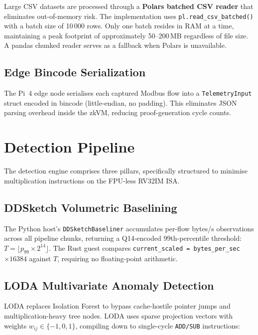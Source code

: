 \documentclass[12pt,a4paper]{article}
\begin{document}
Large CSV datasets are processed through a \textbf{Polars batched CSV reader}
that eliminates out-of-memory risk. The implementation uses
\texttt{pl.read\_csv\_batched()} with a batch size of 10\,000 rows.
Only one batch resides in RAM at a time, maintaining a peak footprint of
approximately 50--200\,MB regardless of file size. A pandas chunked reader
serves as a fallback when Polars is unavailable.

\subsection{Edge Bincode Serialization}

The Pi~4 edge node serialises each captured Modbus flow into a
\texttt{TelemetryInput} struct encoded in bincode (little-endian, no
padding). This eliminates JSON parsing overhead inside the zkVM, reducing
proof-generation cycle counts.

\section{Detection Pipeline}

The detection engine comprises three pillars, specifically structured to
minimise multiplication instructions on the FPU-less RV32IM ISA.

\subsection{DDSketch Volumetric Baselining}

The Python host's \texttt{DDSketchBaseliner} accumulates per-flow
bytes/s observations across all pipeline chunks, returning a Q14-encoded
99th-percentile threshold: $T = \lfloor p_{99} \times 2^{14} \rfloor$.
The Rust guest compares \texttt{current\_scaled = bytes\_per\_sec}
$\times 16384$ against $T$, requiring no floating-point arithmetic.

\subsection{LODA Multivariate Anomaly Detection}

LODA replaces Isolation Forest to bypass cache-hostile pointer jumps and
multiplication-heavy tree nodes. LODA uses sparse projection vectors
with weights $w_{ij} \in \{-1, 0, 1\}$, compiling down to single-cycle
\texttt{ADD/SUB} instructions:
\end{document}
